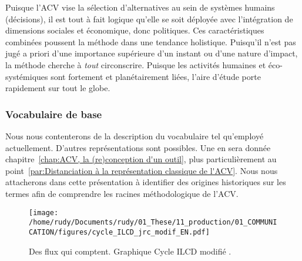 Puisque l'ACV vise la sélection d'alternatives au sein de systèmes humains (décisions), il est tout à fait logique qu'elle se soit déployée avec l'intégration de dimensions sociales et économique, donc politiques.
Ces caractéristiques combinées poussent la méthode dans une tendance holistique.
Puisqu'il n'est pas jugé a priori d'une importance supérieure d'un instant ou d'une nature d'impact, la méthode cherche à \emph{tout} circonscrire.
Puisque les activités humaines et éco-systémiques sont fortement et planétairement liées, l'aire d'étude porte rapidement sur tout le globe.

\subsubsection{Vocabulaire de base}
\label{subsubsec:Vocabulaire de base}
Nous nous contenterons de la description du vocabulaire tel qu'employé actuellement.
D'autres représentations sont possibles.
Une en sera donnée chapitre~\ref{chap:ACV, la (re)conception d'un outil}, plus particulièrement au point~\ref{par:Distanciation à la représentation classique de l'ACV}.
Nous nous attacherons dans cette présentation à identifier des origines historiques sur les termes afin de comprendre les racines méthodologique de l'\gls{ACV}.

\begin{figure}[htbp]
\texttt{[image: /home/rudy/Documents/rudy/01\_These/11\_production/01\_COMMUNICATION/figures/cycle\_ILCD\_jrc\_modif\_EN.pdf]}
\caption{Des flux qui comptent. Graphique Cycle ILCD modifié \cite{european_commission_ilcd_2010}.}
\label{fig:cycle_ILCD_jrc_modif}
\end{figure}
